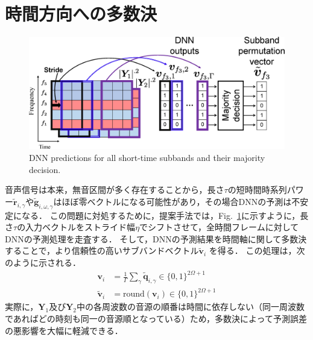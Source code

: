\section{時間方向への多数決}
\label{sec:maj}
\begin{figure}[t]
    \begin{center}
        \includegraphics[width=0.9\columnwidth]{figures/take_time_majority.eps}
    \end{center}
    \vspace{-15pt}
	\caption{DNN predictions for all short-time subbands and their majority decision.}
	\label{fig:take_time_majority}
	\vspace{-8pt}   %
\end{figure}
音声信号は本来，無音区間が多く存在することから，長さ$\tau$の短時間時系列パワー$\tilde{\bm{r}}_{i,\gamma}$や$\tilde{\bm{g}}_{i,\omega,\gamma}$はほぼ零ベクトルになる可能性があり，その場合DNNの予測は不安定になる．
この問題に対処するために，提案手法では，Fig.~\ref{fig:take_time_majority}に示すように，長さ$\tau$の入力ベクトルをストライド幅$\eta$でシフトさせて，全時間フレームに対してDNNの予測処理を走査する．
そして，DNNの予測結果を時間軸に関して多数決することで，より信頼性の高いサブバンドベクトル$\tilde{\bm{v}}_{i}$ を得る．
この処理は，次のように示される．
\begin{align}
    \bm{v}_{i} &= \frac{1}{\Gamma} \sum_{\gamma} \tilde{\bm{q}}_{i,\gamma} \in \{0, 1\}^{2\Omega+1} \\
    \tilde{\bm{v}}_{i} &= \mathrm{round}(\bm{v}_{i}) \in \{0, 1\}^{2\Omega+1}
\end{align}
実際に，$\bm{Y}_1$及び$\bm{Y}_2$中の各周波数の音源の順番は時間に依存しない（同一周波数であればどの時刻も同一の音源順となっている）ため，多数決によって予測誤差の悪影響を大幅に軽減できる．



